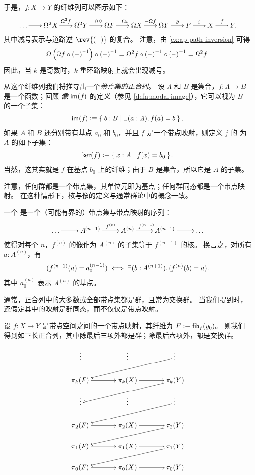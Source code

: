 于是，$f:X\to Y$ 的纤维列可以图示如下：
\[\xymatrix@C=1.5pc{
  \dots \ar[r] &
  \Omega^2 X \ar[r]^-{\Omega^2 f} &
  \Omega^2 Y \ar[r]^-{-\Omega \partial} &
  \Omega F \ar[r]^-{-\Omega i} &
  \Omega X \ar[r]^-{-\Omega f} &
  \Omega Y \ar[r]^-{\partial} &
  F \ar[r]^-{i} &
  X \ar[r]^{f} & Y.}\]
其中减号表示与道路逆 $\rev{(\blank)}$ 的复合。
注意，由 \cref{ex:ap-path-inversion} 可得
\[ \Omega\left(\Omega f\circ \mathord{{(\mathord{\hspace{1pt}\text{--}\hspace{1pt}})}^{-1}}\right) \circ \mathord{{(\mathord{\hspace{1pt}\text{--}\hspace{1pt}})}^{-1}}
= \Omega^2 f \circ \mathord{{(\mathord{\hspace{1pt}\text{--}\hspace{1pt}})}^{-1}} \circ \mathord{{(\mathord{\hspace{1pt}\text{--}\hspace{1pt}})}^{-1}}
= \Omega^2 f.
\]
因此，当 $k$ 是奇数时，$k$ 重环路映射上就会出现减号。

从这个纤维列我们将推导出一个\emph{带点集的正合列}。
%
设 $A$ 和 $B$ 是集合，$f:A\to B$ 是一个函数；回顾 \emph{像} $\mathsf{im}(f)$ 的定义（参见 \cref{defn:modal-image}），它可以视为 $B$ 的一个子集：
\[\im(f) \defeq \setof{b:B | \exis{a:A} f(a)=b}. \]
如果 $A$ 和 $B$ 还分别带有基点 $a_0$ 和 $b_0$，并且 $f$ 是一个带点映射，则定义 $f$ 的
%
%
为 $A$ 的如下子集：
\[\ker(f) \vcentcolon\equiv \Set{x:A | f(x) = b_0}. \]
当然，这其实就是 $f$ 在基点 $b_0$ 上的纤维；由于 $B$ 是集合，所以它是 $A$ 的子集。

注意，任何群都是一个带点集，其单位元即为基点；任何群同态都是一个带点映射。
在这种情形下，核与像的定义与通常群论中的概念一致。

\begin{defn}
  一个
  是一个（可能有界的）带点集与带点映射的序列：
  \[\xymatrix{\dots \ar[r] & A^{(n+1)} \ar[r]^-{f^{(n)}} & A^{(n)} \ar[r]^{f^{(n-1)}} & A^{(n-1)} \ar[r] &
    \dots}\]
  使得对每个 $n$，$f^{(n)}$ 的像作为 $A^{(n)}$ 的子集等于 $f^{(n-1)}$ 的核。
  换言之，对所有 $a:A^{(n)}$，有
  \[ (f^{(n-1)}(a) = a^{(n-1)}_0) \iff \exis{b:A^{(n+1)}} (f^{(n)}(b)=a). \]
  其中 $a^{(n)}_0$ 表示 $A^{(n)}$ 的基点。
\end{defn}

通常，正合列中的大多数或全部带点集都是群，且常为交换群。
当我们提到时，还假定其中的映射是群同态，而不仅仅是带点映射。



\begin{thm}\label{thm:les}
  设 $f:X \to Y$ 是带点空间之间的一个带点映射，其纤维为 $F\vcentcolon\equiv {\mathsf{fib}}_{f}(y_0)$。
  则我们得到如下长正合列，其中除最后三项外都是群；除最后六项外，都是交换群。

  \[
  \xymatrix@R=1.2pc@C=3pc{
    \vdots & \vdots & \vdots \ar[lld] \\
    \pi_k(F) \ar[r] & \pi_k(X) \ar[r] & \pi_k(Y) \ar[lld] \\
    \vdots & \vdots & \vdots \ar[lld] \\
    \pi_2(F) \ar[r] & \pi_2(X) \ar[r] & \pi_2(Y) \ar[lld] \\
    \pi_1(F) \ar[r] & \pi_1(X) \ar[r] & \pi_1(Y) \ar[lld]\\
    \pi_0(F) \ar[r] & \pi_0(X) \ar[r] & \pi_0(Y)}
  \]
\end{thm}

